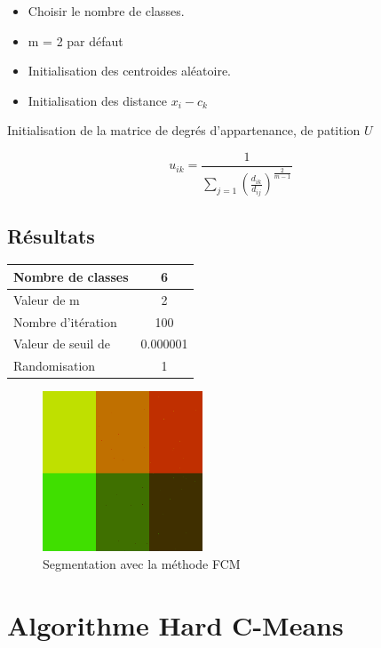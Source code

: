 \documentclass[a4paper,11pt]{article}
\begin{document}
\begin{itemize}
 \item Choisir le nombre de classes.
 \item m = 2 par défaut
 \item Initialisation des centroides aléatoire.
 \item Initialisation des distance $x_i-c_k$\\
\end{itemize}

Initialisation de la matrice de degrés d'appartenance, de patition $U$\\

\begin{Large}
$$
u_{ik} = \frac{1}{\sum\limits_{j=1}(\frac{d_{ik}}{d_{ij}})^{\frac{2}{m-1}}}
$$
\end{Large}

\subsection{Résultats}

\begin{tabular}{|l|c|}
  \hline
  Nombre de classes & 6 \\
  \hline
  Valeur de m & 2 \\
  \hline
  Nombre d'itération & 100 \\
  \hline
  Valeur de seuil de  & 0.000001 \\
  \hline
  Randomisation & 1 \\
  \hline
\end{tabular}

\begin{figure}[H]
  \begin{center} 
    \includegraphics[width=180px]{../img/segFCM.png}
    \caption{Segmentation avec la méthode FCM}
  \end{center}
\end{figure}

\section{Algorithme Hard C-Means}
\end{document}
